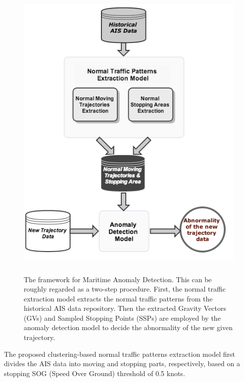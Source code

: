 \documentclass[12pt,glossary]{dalcsthesis}
\begin{document}
\begin{figure}[!htb]
\centering
\includegraphics[height=15cm]{structure}
\caption{The framework for Maritime Anomaly Detection. This can be roughly regarded as a two-step procedure. First, the normal traffic extraction model extracts the normal traffic patterns from the historical AIS data repository. Then the extracted Gravity Vectors (GVs) and Sampled Stopping Points (SSPs) are employed by the anomaly detection model to decide the abnormality of the new given trajectory.}
\label{fig:systemStructure}
\end{figure}





The proposed clustering-based normal traffic patterns extraction model first divides the AIS data into moving and stopping parts, respectively, based on a stopping SOG (Speed Over Ground) threshold of 0.5 knots. 
\end{document}
